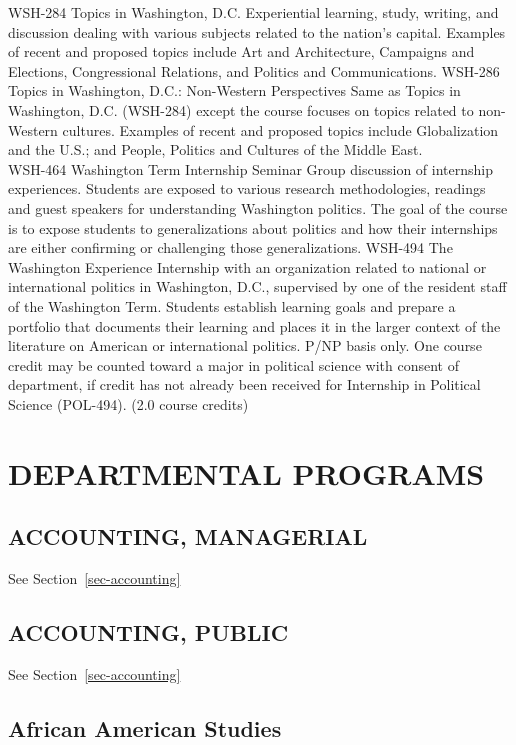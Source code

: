 \documentclass[
  letterpaper,
]{scrbook}
\begin{document}
WSH-284 Topics in Washington, D.C. Experiential learning, study,
writing, and discussion dealing with various subjects related to the
nation's capital. Examples of recent and proposed topics include Art and
Architecture, Campaigns and Elections, Congressional Relations, and
Politics and Communications. WSH-286 Topics in Washington, D.C.:
Non-Western Perspectives Same as Topics in Washington, D.C. (WSH-284)
except the course focuses on topics related to non-Western cultures.
Examples of recent and proposed topics include Globalization and the
U.S.; and People, Politics and Cultures of the Middle East.\\
WSH-464 Washington Term Internship Seminar Group discussion of
internship experiences. Students are exposed to various research
methodologies, readings and guest speakers for understanding Washington
politics. The goal of the course is to expose students to
generalizations about politics and how their internships are either
confirming or challenging those generalizations. WSH-494 The Washington
Experience Internship with an organization related to national or
international politics in Washington, D.C., supervised by one of the
resident staff of the Washington Term. Students establish learning goals
and prepare a portfolio that documents their learning and places it in
the larger context of the literature on American or international
politics. P/NP basis only. One course credit may be counted toward a
major in political science with consent of department, if credit has not
already been received for Internship in Political Science (POL-494).
(2.0 course credits)

\chapter{DEPARTMENTAL PROGRAMS}\label{departmental-programs}

\section{ACCOUNTING, MANAGERIAL}\label{accounting-managerial}

See Section~\ref{sec-accounting}

\section{ACCOUNTING, PUBLIC}\label{accounting-public}

See Section~\ref{sec-accounting}

\section{African American Studies}\label{african-american-studies}
\end{document}
